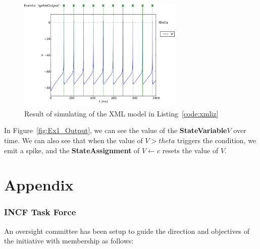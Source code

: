 \documentclass{article}
\newcommand{\StateVariable}{{\bf{StateVariable}}\xspace}
\newcommand{\StateAssignment}{{\bf{StateAssignment}}\xspace}
\begin{document}
\begin{figure}[htb!]
\center
\includegraphics[width=8cm]{figures/example_IzVoltageWave.pdf}
\protect\caption{Result of simulating of the XML model in Listing~\ref{code:xmliz}}
\label{fig:EX1_Output}
\end{figure}

In Figure~\ref{fig:Ex1_Output}, we can see the value of the \StateVariable $V$
over time. We can also see that when the value of $V>theta$ triggers the
condition, we emit a spike, and the \StateAssignment of $V \leftarrow c$ resets
the value of $V$.


\newpage
\appendix

\part*{Appendix}

\section{INCF Task Force}

An oversight committee has been setup to guide the direction and
objectives of the initiative with membership as follows:
\end{document}
